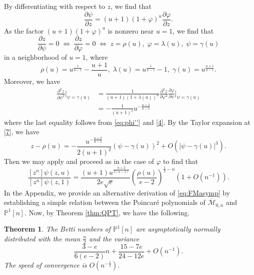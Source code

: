 \documentclass[11pt,letterpaper]{amsart}
\numberwithin{equation}{section}
\newtheorem{theorem}{Theorem}[section]
\theoremstyle{definition}
\newcommand{\PP}{\mathbb{P}}
\newcommand{\cal}{\mathcal}
\def\cM{{\cal M}}
\def\mzn{\overline{\cM}_{0,n} }
\def\beq{\begin{equation}}
\def\eeq{\end{equation}}
\begin{document}
By differentiating with respect to $z$, we find that
\beq\label{5}
\frac{\partial \psi}{\partial z}=(u+1)(1+\varphi)^u\frac{\partial \varphi}{\partial z}.\eeq
As the factor $(u+1)(1+\varphi)^u$ is nonzero near $u=1$, we find that %
\beq\label{6}\frac{\partial z}{\partial \psi}=0 \;\Leftrightarrow \;
\frac{\partial z}{\partial \varphi}=0 \;\Leftrightarrow \;
z=\rho(u),\; \varphi=\lambda(u), \; \psi=\gamma(u)\eeq
in a neighborhood of $u=1$, where
\beq\label{7}
\rho(u)=u^{\frac{1}{u-1}}-\frac{u+1}{u},\; \lambda(u)=u^{\frac{1}{u-1}}-1,\; \gamma(u)=u^{\frac{u+1}{u-1}}.\eeq
Moreover, we have
\beq\label{8}
\begin{split}
\frac{\partial^2z}{\partial \psi^2}|_{\psi=\gamma(u)}&=
\frac1{(u+1)(1+\lambda(u))^u}\frac{\partial^2 z}{\partial \varphi^2}\frac{\partial \varphi}{\partial \psi}|_{\psi=\gamma(u)}\\
&=-\frac{1}{(u+1)^2}u^{-\frac{u+2}{u-1}}
\end{split}
\eeq
where the last equality follows from \eqref{eq:phi''} and \eqref{4}.
By the Taylor expansion at \eqref{7}, we have
\beq\label{9}
z-\rho(u) =-\frac{u^{-\frac{u+2}{u-1}}}{2(u+1)^2}
(\psi-\gamma(u))^2+O\left(|\psi-\gamma(u)|^3\right).\eeq
Then we may apply \cite[Theorem VI.4]{FS} and proceed as in the case of $\varphi$ to find that
\beq \label{eq:FMasymp} \frac{[z^n]\psi(z,u)}{[z^n]\psi(z,1)}=
\frac{(u+1) u^\frac{u+2}{2(u-1)}}{2e\sqrt{e}} \left(\frac{\rho(u)}{e-2}\right)^{\frac12 -n}  \left(1+O(n^{-1})\right).\eeq
In the Appendix, we provide an alternative derivation of \eqref{eq:FMasymp} by establishing a simple relation between the Poincar\'e polynomials of $\mzn$ and $\PP^1[n]$. Now, by Theorem \ref{thm:QPT}, we have the following.
\begin{theorem}
 The Betti numbers of $\PP^1[n]$ are asymptotically normally distributed with the mean $\frac{n}{2}$ and the variance $$\frac{3-e}{6(e-2)}n+ \frac{15-7e}{24-12e} + O(n^{-1}).$$ The speed of convergence is $O(n^{-\frac12}).$
\end{theorem}
\end{document}
